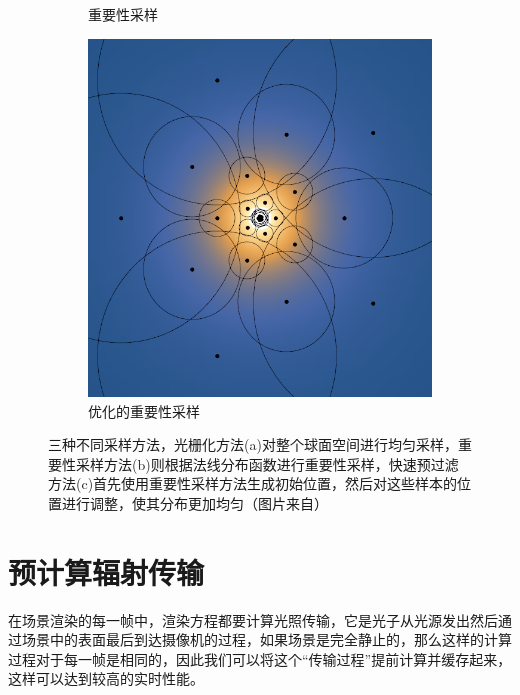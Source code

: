 \begin{figure}
\begin{fullwidth}
\begin{subfigure}[b]{0.325\thewidth}
			\caption{重要性采样}
	\end{subfigure}
	\begin{subfigure}[b]{0.325\thewidth}
		\includegraphics[width=\textwidth]{figures/pl/sampling-optimized}
			\caption{优化的重要性采样}
	\end{subfigure}
	\caption{三种不同采样方法，光栅化方法(a)对整个球面空间进行均匀采样，重要性采样方法(b)则根据法线分布函数进行重要性采样，快速预过滤方法(c)首先使用重要性采样方法生成初始位置，然后对这些样本的位置进行调整，使其分布更加均匀（图片来自\cite{a:FastFilteringofReflectionProbes}）}
	\label{f:pl-sampling-comparation}
\end{fullwidth}
\end{figure}





\section{预计算辐射传输}\label{sec:pl-prt}
在场景渲染的每一帧中，渲染方程都要计算光照传输，它是光子从光源发出然后通过场景中的表面最后到达摄像机的过程，如果场景是完全静止的，那么这样的计算过程对于每一帧是相同的，因此我们可以将这个“传输过程”提前计算并缓存起来，这样可以达到较高的实时性能。

